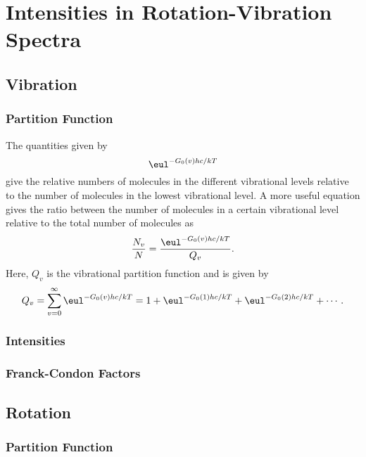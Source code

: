 \chapter{Intensities in Rotation-Vibration Spectra}
\label{c:intensities_in_rotation-vibration_spectra}

\section{Vibration}
\label{s:vibration}

\subsection{Partition Function}

The quantities given by
\begin{equation*}
    \eul^{-G_0(v)hc/kT}
\end{equation*}
give the relative numbers of molecules in the different vibrational levels relative to the number of molecules in the lowest vibrational level. A more useful equation gives the ratio between the number of molecules in a certain vibrational level relative to the total number of molecules as
\begin{equation*}
    \frac{N_v}{N} = \frac{\eul^{-G_0(v)hc/kT}}{Q_v}.
\end{equation*}
Here, $Q_v$ is the vibrational partition function and is given by
\begin{equation*}
    Q_v = \sum_{v=0}^{\infty}\eul^{-G_0(v)hc/kT} = 1 + \eul^{-G_0(1)hc/kT} + \eul^{-G_0(2)hc/kT} + \dotsb.
\end{equation*}

\subsection{Intensities}

\subsection{Franck-Condon Factors}

\section{Rotation}
\label{s:rotation}

\subsection{Partition Function}

